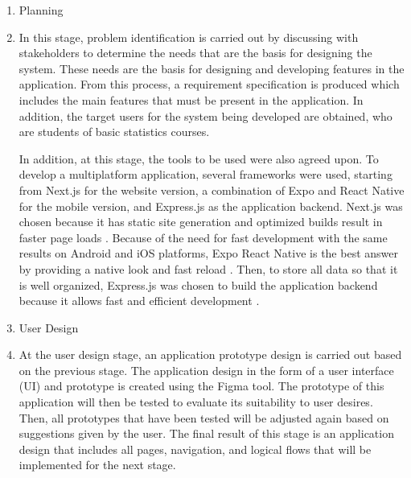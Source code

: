 \documentclass[conference,a4paper]{IEEEtran}
\begin{document}
\noindent
\begin{enumerate}
  \item Planning
  \item[] In this stage, problem identification is carried out by discussing with stakeholders to determine the needs that are the basis for designing the system. These needs are the basis for designing and developing features in the application. From this process, a requirement specification is produced which includes the main features that must be present in the application. In addition, the target users for the system being developed are obtained, who are students of basic statistics courses.

        In addition, at this stage, the tools to be used were also agreed upon. To develop a multiplatform application, several frameworks were used, starting from Next.js for the website version, a combination of Expo and React Native for the mobile version, and Express.js as the application backend. Next.js was chosen because it has static site generation and optimized builds result in faster page loads \cite{b21}. Because of the need for fast development with the same results on Android and iOS platforms, Expo React Native is the best answer by providing a native look and fast reload \cite{b22}. Then, to store all data so that it is well organized, Express.js was chosen to build the application backend because it allows fast and efficient development \cite{b23}.

  \item User Design
  \item [] At the user design stage, an application prototype design is carried out based on the previous stage. The application design in the form of a user interface (UI) and prototype is created using the Figma tool. The prototype of this application will then be tested to evaluate its suitability to user desires. Then, all prototypes that have been tested will be adjusted again based on suggestions given by the user. The final result of this stage is an application design that includes all pages, navigation, and logical flows that will be implemented for the next stage.


\end{enumerate}
\end{document}
